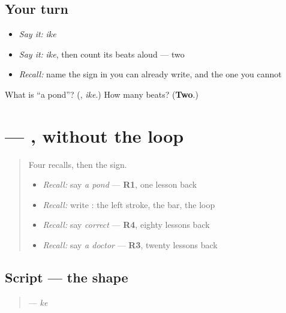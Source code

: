 \subsection*{Your turn}
\begin{itemize}
\raggedright
  \item \emph{Say it:} \emph{ike}
  \item \emph{Say it:} \emph{ike}, then count its beats aloud — two
  \item \emph{Recall:} name the sign in \textbf{} you can already write, and the one you cannot
\end{itemize}

\begin{tcolorbox}[breakable,colback=teal!4,colframe=teal!35!black,title={Before you move on}]
What is \textquotedblleft{}a pond\textquotedblright{}? (\textbf{}, \emph{ike}.) How many beats? (\textbf{Two}.)
\end{tcolorbox}
\section[\texorpdfstring{\ja{け} (ke)}{け (ke)}]{ — , without the loop}

\label{lesson:JA-W133-ke}



\begin{quote}
Four recalls, then the sign.

\begin{itemize}
\raggedright
  \item \emph{Recall:} say \emph{a pond} — \textbf{R1}, one lesson back
  \item \emph{Recall:} write \textbf{}: the left stroke, the bar, the loop
  \item \emph{Recall:} say \emph{correct} — \textbf{R4}, eighty lessons back
  \item \emph{Recall:} say \emph{a doctor} — \textbf{R3}, twenty lessons back
\end{itemize}
\end{quote}

\subsection*{Script — the shape}

\begin{quote}
\textbf{} — \emph{ke}
\end{quote}

